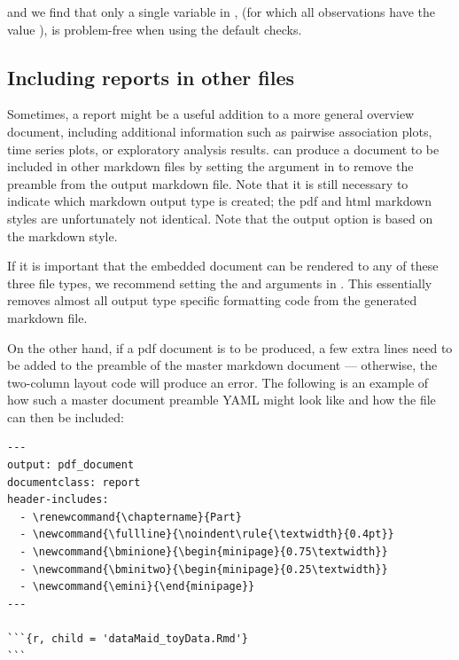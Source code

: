 \documentclass[article,shortnames]{jss}
\begin{document}
and we find that only a single variable in ,  (for which all
observations have the value ), is problem-free when using the default checks.


\subsection[Including dataMaid reports in other files]{Including  reports in other files}
Sometimes, a  report might be a useful addition to a
more general overview document, including additional information such
as pairwise association plots, time series plots, or exploratory
analysis results.   can produce a document to be
included in other  markdown files by setting the
 argument in  to remove the preamble
from the output  markdown file. Note that it is still
necessary to indicate which  markdown output type is
created; the pdf and html  markdown styles are
unfortunately not identical. Note that the  output option is based on the  markdown style. 

If it is important that the embedded  document can be
rendered to any of these three file types, we recommend setting the
 and  arguments in . This 
essentially removes almost all output type specific formatting code
from the generated  markdown file.

On the other hand, if a pdf document is to be produced, a few extra
lines need to be added to the preamble of the master  markdown
document --- otherwise, the two-column layout code will produce an
error. The following is an example of how such a master document
preamble YAML might look like and how the  file can
then be included:

\begin{Verbatim}
---
output: pdf_document
documentclass: report
header-includes:
  - \renewcommand{\chaptername}{Part}
  - \newcommand{\fullline}{\noindent\rule{\textwidth}{0.4pt}}
  - \newcommand{\bminione}{\begin{minipage}{0.75\textwidth}}
  - \newcommand{\bminitwo}{\begin{minipage}{0.25\textwidth}}
  - \newcommand{\emini}{\end{minipage}}
---

```{r, child = 'dataMaid_toyData.Rmd'}
```
\end{Verbatim}
\end{document}
